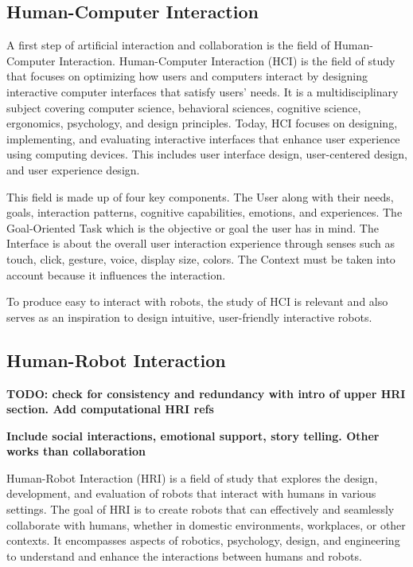 \subsection{Human-Computer Interaction}

A first step of artificial interaction and collaboration is the field of Human-Computer Interaction. Human-Computer Interaction (HCI) is the field of study that focuses on optimizing how users and computers interact by designing interactive computer interfaces that satisfy users' needs. It is a multidisciplinary subject covering computer science, behavioral sciences, cognitive science, ergonomics, psychology, and design principles.
Today, HCI focuses on designing, implementing, and evaluating interactive interfaces that enhance user experience using computing devices. This includes user interface design, user-centered design, and user experience design. 

This field is made up of four key components. 
The User along with their needs, goals, interaction patterns, cognitive capabilities, emotions, and experiences.
The Goal-Oriented Task which is the objective or goal the user has in mind.
The Interface is about the overall user interaction experience through senses such as touch, click, gesture, voice, display size, colors.
The Context must be taken into account because it influences the interaction. 

To produce easy to interact with robots, the study of HCI is relevant and also serves as an inspiration to design intuitive, user-friendly interactive robots.

\subsection{Human-Robot Interaction}

\textbf{TODO: check for consistency and redundancy with intro of upper HRI section. Add computational HRI refs}

\textbf{Include social interactions, emotional support, story telling. Other works than collaboration}

Human-Robot Interaction (HRI) is a field of study that explores the design, development, and evaluation of robots that interact with humans in various settings. The goal of HRI is to create robots that can effectively and seamlessly collaborate with humans, whether in domestic environments, workplaces, or other contexts. It encompasses aspects of robotics, psychology, design, and engineering to understand and enhance the interactions between humans and robots.

